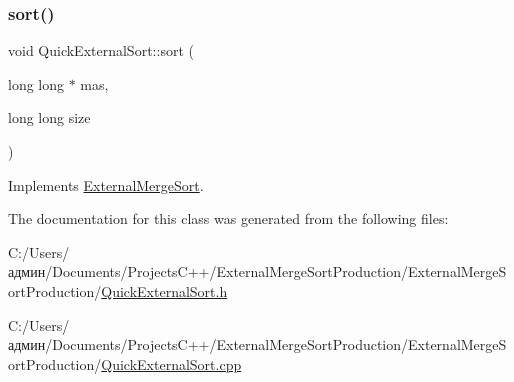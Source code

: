 \hypertarget{class_quick_external_sort_adafdd4faded04218c1a131bf55e3c90d}{}\label{class_quick_external_sort_adafdd4faded04218c1a131bf55e3c90d} 
\subsubsection{\texorpdfstring{sort()}{sort()}}
{\footnotesize\ttfamily void Quick\+External\+Sort\+::sort (\begin{DoxyParamCaption}\item[{long long $\ast$}]{mas,  }\item[{long long}]{size }\end{DoxyParamCaption})\hspace{0.3cm}{\ttfamily [virtual]}}



Implements \hyperlink{class_external_merge_sort_af6412221cc797a846243a343ccc12dba}{External\+Merge\+Sort}.



The documentation for this class was generated from the following files\+:\begin{DoxyCompactItemize}
\item 
C\+:/\+Users/админ/\+Documents/\+Projects\+C++/\+External\+Merge\+Sort\+Production/\+External\+Merge\+Sort\+Production/\hyperlink{_quick_external_sort_8h}{Quick\+External\+Sort.\+h}\item 
C\+:/\+Users/админ/\+Documents/\+Projects\+C++/\+External\+Merge\+Sort\+Production/\+External\+Merge\+Sort\+Production/\hyperlink{_quick_external_sort_8cpp}{Quick\+External\+Sort.\+cpp}\end{DoxyCompactItemize}
